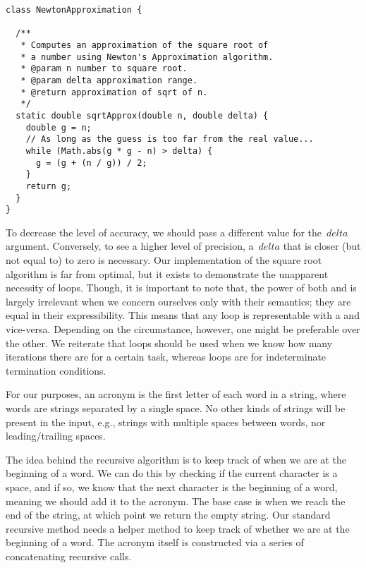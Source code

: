 \enlargethispage{-2\baselineskip}
\begin{lstlisting}[language=MyJava]
class NewtonApproximation {

  /**
   * Computes an approximation of the square root of
   * a number using Newton's Approximation algorithm.
   * @param n number to square root.
   * @param delta approximation range.
   * @return approximation of sqrt of n.
   */
  static double sqrtApprox(double n, double delta) {
    double g = n;
    // As long as the guess is too far from the real value...
    while (Math.abs(g * g - n) > delta) {
      g = (g + (n / g)) / 2;
    }
    return g;
  }
}
\end{lstlisting}

To decrease the level of accuracy, we should pass a different value for the~$\mathit{delta}$ argument. 
Conversely, to see a higher level of precision, a~$\mathit{delta}$ that is closer (but not equal to) to zero is necessary. 
Our implementation of the square root algorithm is far from optimal, but it exists to demonstrate the unapparent necessity of  loops. 
Though, it is important to note that, the power of both  and  is largely irrelevant when we concern ourselves only with their semantics; they are equal in their expressibility.
This means that any  loop is representable with a  and vice-versa. 
Depending on the circumstance, however, one might be preferable over the other. 
We reiterate that  loops should be used when we know how many iterations there are for a certain task, whereas  loops are for indeterminate termination conditions. 

For our purposes, an acronym is the first letter of each word in a string, where words are strings separated by a single space. 
No other kinds of strings will be present in the input, e.g., strings with multiple spaces between words, nor leading/trailing spaces.

The idea behind the recursive algorithm is to keep track of when we are at the beginning of a word.
We can do this by checking if the current character is a space, and if so, we know that the next character is the beginning of a word, meaning we should add it to the acronym.
The base case is when we reach the end of the string, at which point we return the empty string.
Our standard recursive method needs a helper method to keep track of whether we are at the beginning of a word.
The acronym itself is constructed via a series of concatenating recursive calls.

